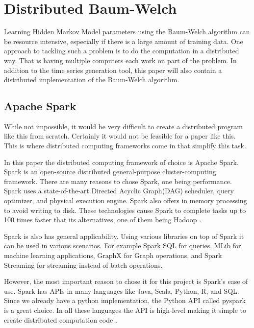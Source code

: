 
\chapter{Distributed Baum-Welch}\label{chapter:hmm-dist}

Learning Hidden Markov Model parameters using the Baum-Welch algorithm can be resource intensive, especially if there is a large amount of training data. One approach to tackling such a problem is to do the computation in a distributed way. That is having multiple computers each work on part of the problem. In addition to the time series generation tool, this paper will also contain a distributed implementation of the Baum-Welch algorithm. 

\section{Apache Spark}

While not impossible, it would be very difficult to create a distributed program like this from scratch. Certainly it would not be feasible for a paper like this. This is where distributed computing frameworks come in that simplify this task. 

In this paper the distributed computing framework of choice is Apache Spark. Spark is an open-source distributed general-purpose cluster-computing framework. There are many reasons to chose Spark, one being performance. Spark uses a state-of-the-art Directed Acyclic Graph(DAG) scheduler, query optimizer, and physical execution engine. Spark also offers in memory processing to avoid writing to disk. These technologies cause Spark to complete tasks up to 100 times faster that its alternatives, one of them being Hadoop \parencite{zaharia2016apache}.

Spark is also has general applicability. Using various libraries on top of Spark it can be used in various scenarios. For example Spark SQL for queries, MLib for machine learning applications, GraphX for Graph operations, and Spark Streaming for streaming instead of batch operations. 

However, the most important reason to chose it for this project is Spark's ease of use. Spark has APIs in many languages like Java, Scala, Python, R, and SQL. Since we already have a python implementation, the Python API called pyspark is a great choice. In all these languages the API is high-level making it simple to create distributed computation code \parencite{pyspark}.

